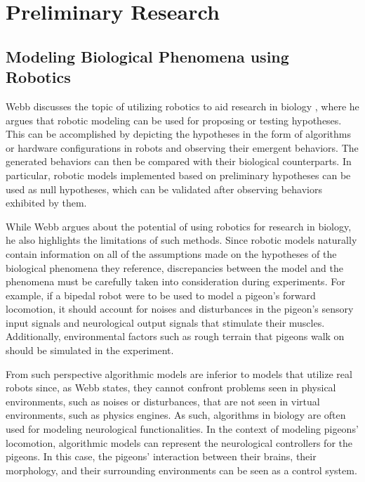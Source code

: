 \chapter{Preliminary Research}
\section{Modeling Biological Phenomena using Robotics}
  Webb discusses the topic of utilizing robotics to aid research in biology \cite{webb2000does}, where he argues that robotic modeling can be used for proposing or testing hypotheses. This can be accomplished by depicting the hypotheses in the form of algorithms or hardware configurations in robots and observing their emergent behaviors. The generated behaviors can then be compared with their biological counterparts. In particular, robotic models implemented based on preliminary hypotheses can be used as null hypotheses, which can be validated after observing behaviors exhibited by them.

    While Webb argues about the potential of using robotics for research in biology, he also highlights the limitations of such methods.
    Since robotic models naturally contain information on all of the assumptions made on the hypotheses of the biological phenomena they reference, discrepancies between the model and the phenomena must be carefully taken into consideration during experiments. For example, if a bipedal robot were to be used to model a pigeon's forward locomotion, it should account for noises and disturbances in the pigeon's sensory input signals and neurological output signals that stimulate their muscles. Additionally, environmental factors such as rough terrain that pigeons walk on should be simulated in the experiment.

    From such perspective algorithmic models are inferior to models that utilize real robots since, as Webb states, they cannot confront problems seen in physical environments, such as noises or disturbances, that are not seen in virtual environments, such as physics engines.
      As such, algorithms in biology are often used for modeling neurological functionalities. In the context of modeling pigeons' locomotion, algorithmic models can represent the neurological controllers for the pigeons. In this case, the pigeons' interaction between their brains, their morphology, and their surrounding environments can be seen as a control system.
%

